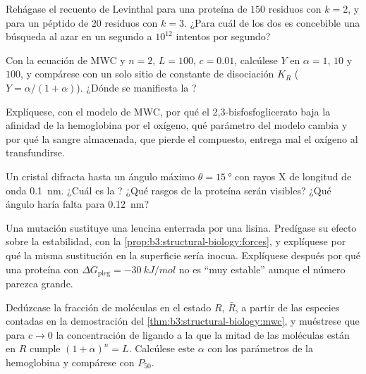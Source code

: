 \begin{exercise}[$\star\star$]\label{exo:b3:structural-biology:5}
Rehágase el recuento de Levinthal para una proteína de $150$ residuos con
$k = 2$, y para un péptido de $20$ residuos con $k = 3$. ¿Para cuál de
los dos es concebible una búsqueda al azar en un segundo a $10^{12}$
intentos por segundo?
\end{exercise}

\begin{exercise}[$\star\star$]\label{exo:b3:structural-biology:6}
Con la ecuación de MWC y $n = 2$, $L = 100$, $c = 0.01$, calcúlese $Y$ en
$\alpha = 1$, $10$ y $100$, y compárese con un solo sitio de constante de
disociación $K_{R}$ ($Y = \alpha/(1+\alpha)$). ¿Dónde se manifiesta la
?
\end{exercise}

\begin{exercise}[$\star\star$]\label{exo:b3:structural-biology:7}
Explíquese, con el modelo de MWC, por qué el 2,3-bisfosfoglicerato baja
la afinidad de la hemoglobina por el oxígeno, qué parámetro del modelo
cambia y por qué la sangre almacenada, que pierde el compuesto, entrega
mal el oxígeno al transfundirse.
\end{exercise}

\begin{exercise}[$\star\star$]\label{exo:b3:structural-biology:8}
Un cristal difracta hasta un ángulo máximo $\theta = \qty{15}{\degree}$
con rayos X de longitud de onda \qty{0.1}{nm}. ¿Cuál es la ?
¿Qué rasgos de la proteína serán visibles? ¿Qué ángulo haría falta para
\qty{0.12}{nm}?
\end{exercise}

\begin{exercise}[$\star\star$]\label{exo:b3:structural-biology:9}
Una mutación sustituye una leucina enterrada por una lisina. Predígase su
efecto sobre la estabilidad, con la
\cref{prop:b3:structural-biology:forces}, y explíquese por qué la misma
sustitución en la superficie sería inocua. Explíquese después por qué una
proteína con $\Delta G_{\text{pleg}} =
\qty{-30}{kJ/mol}$ no es ``muy estable'' aunque el número parezca grande.
\end{exercise}

\begin{exercise}[$\star\star\star$]\label{exo:b3:structural-biology:10}
Dedúzcase la fracción de moléculas en el estado $R$, $\bar R$, a partir
de las especies contadas en la demostración del
\cref{thm:b3:structural-biology:mwc}, y muéstrese que para $c \to 0$ la
concentración de ligando a la que la mitad de las moléculas están en $R$
cumple $(1+\alpha)^{n} = L$. Calcúlese este $\alpha$ con los parámetros
de la hemoglobina y compárese con $P_{50}$.
\end{exercise}

